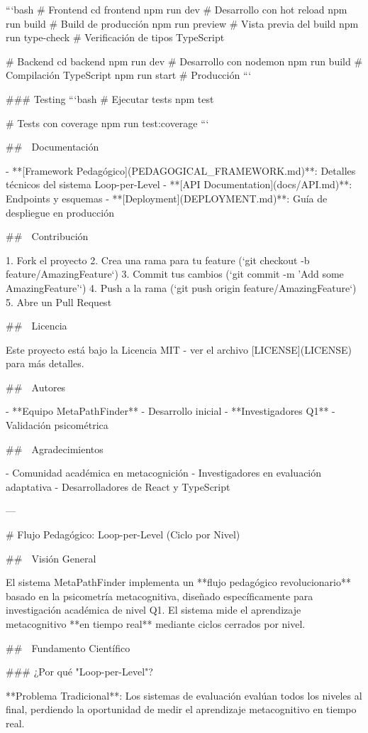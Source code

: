 ```bash
# Frontend
cd frontend
npm run dev          # Desarrollo con hot reload
npm run build        # Build de producción
npm run preview      # Vista previa del build
npm run type-check   # Verificación de tipos TypeScript

# Backend
cd backend
npm run dev          # Desarrollo con nodemon
npm run build        # Compilación TypeScript
npm run start        # Producción
```

### Testing
```bash
# Ejecutar tests
npm test

# Tests con coverage
npm run test:coverage
```

## 📖 Documentación

- **[Framework Pedagógico](PEDAGOGICAL_FRAMEWORK.md)**: Detalles técnicos del sistema Loop-per-Level
- **[API Documentation](docs/API.md)**: Endpoints y esquemas
- **[Deployment](DEPLOYMENT.md)**: Guía de despliegue en producción

## 🤝 Contribución

1. Fork el proyecto
2. Crea una rama para tu feature (`git checkout -b feature/AmazingFeature`)
3. Commit tus cambios (`git commit -m 'Add some AmazingFeature'`)
4. Push a la rama (`git push origin feature/AmazingFeature`)
5. Abre un Pull Request

## 📄 Licencia

Este proyecto está bajo la Licencia MIT - ver el archivo [LICENSE](LICENSE) para más detalles.

## 👥 Autores

- **Equipo MetaPathFinder** - Desarrollo inicial
- **Investigadores Q1** - Validación psicométrica

## 🙏 Agradecimientos

- Comunidad académica en metacognición
- Investigadores en evaluación adaptativa
- Desarrolladores de React y TypeScript

---

# Flujo Pedagógico: Loop-per-Level (Ciclo por Nivel)

## 🎯 Visión General

El sistema MetaPathFinder implementa un **flujo pedagógico revolucionario** basado en la psicometría metacognitiva, diseñado específicamente para investigación académica de nivel Q1. El sistema mide el aprendizaje metacognitivo **en tiempo real** mediante ciclos cerrados por nivel.

## 🧠 Fundamento Científico

### ¿Por qué "Loop-per-Level"?

**Problema Tradicional**: Los sistemas de evaluación evalúan todos los niveles al final, perdiendo la oportunidad de medir el aprendizaje metacognitivo en tiempo real.

